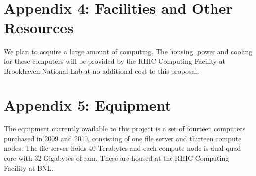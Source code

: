 \documentclass[12pt]{article}
\begin{document}
\newpage
{}
\section*{Appendix 4: Facilities and Other Resources}

We plan to acquire a large amount of computing.  The housing, power and cooling
for these computers will be provided by the RHIC Computing Facility at
Brookhaven National Lab at no additional cost to this proposal.		

\newpage
{}
\section*{Appendix 5: Equipment}

The equipment currently available to this project is a set of fourteen
computers purchased in 2009 and 2010, consisting of one file server and
thirteen compute nodes.  The file server holds 40 Terabytes and each compute
node is dual quad core with 32 Gigabytes of ram.  These are housed at the RHIC
Computing Facility at BNL.
\end{document}

